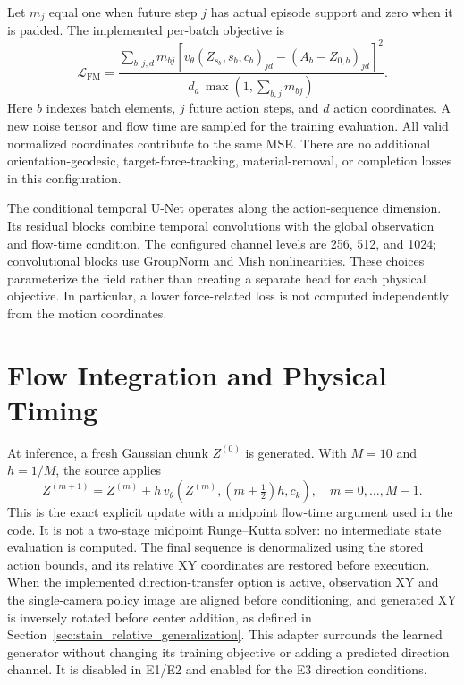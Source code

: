Let \(m_j\) equal one when future step \(j\) has actual episode support and zero when it is padded. The implemented per-batch objective is
\begin{equation}
 \mathcal L_{\mathrm{FM}}=
 \frac{\displaystyle\sum_{b,j,d}m_{bj}
 \left[v_\theta(Z_{s_b},s_b,c_b)_{jd}-(A_b-Z_{0,b})_{jd}\right]^2}
 {d_a\,\max\!\left(1,\sum_{b,j}m_{bj}\right)}.
 \label{eq:imitation_loss}
\end{equation}
Here \(b\) indexes batch elements, \(j\) future action steps, and \(d\) action coordinates. A new noise tensor and flow time are sampled for the training evaluation. All valid normalized coordinates contribute to the same MSE. There are no additional orientation-geodesic, target-force-tracking, material-removal, or completion losses in this configuration.

The conditional temporal U-Net operates along the action-sequence dimension. Its residual blocks combine temporal convolutions with the global observation and flow-time condition. The configured channel levels are 256, 512, and 1024; convolutional blocks use GroupNorm and Mish nonlinearities. These choices parameterize the field rather than creating a separate head for each physical objective. In particular, a lower force-related loss is not computed independently from the motion coordinates.

\section{Flow Integration and Physical Timing}
At inference, a fresh Gaussian chunk \(Z^{(0)}\) is generated. With \(M=10\) and \(h=1/M\), the source applies
\begin{equation}
 Z^{(m+1)}=Z^{(m)}+h\,
 v_\theta\!\left(Z^{(m)},(m+\tfrac12)h,c_k\right),
 \quad m=0,\ldots,M-1.
 \label{eq:flow_integration}
\end{equation}
This is the exact explicit update with a midpoint flow-time argument used in the code. It is not a two-stage midpoint Runge--Kutta solver: no intermediate state evaluation is computed. The final sequence is denormalized using the stored action bounds, and its relative XY coordinates are restored before execution. When the implemented direction-transfer option is active, observation XY and the single-camera policy image are aligned before conditioning, and generated XY is inversely rotated before center addition, as defined in Section~\ref{sec:stain_relative_generalization}. This adapter surrounds the learned generator without changing its training objective or adding a predicted direction channel. It is disabled in E1/E2 and enabled for the E3 direction conditions.

